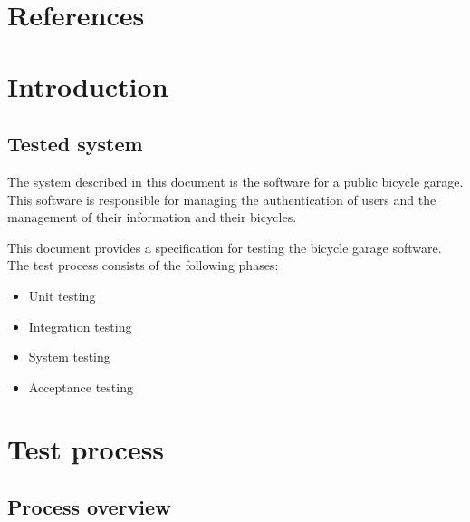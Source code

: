 \documentclass[12pt,titlepage,bibliography=totoc]{article}
\begin{document}


\maketitle
\newpage
\tableofcontents
\thispagestyle{empty}
\setcounter{page}{0}
\newpage


\section{References}
\label{sec:references}


\section{Introduction}
\label{sec:introduction}
\subsection{Tested system}

The system described in this document is the software for a public bicycle
garage. This software is responsible for managing the authentication of users
and the management of their information and their bicycles.

This document provides a specification for testing the bicycle garage software.
The test process consists of the following phases:

\begin{itemize}
	\item Unit testing
	\item Integration testing
	\item System testing
	\item Acceptance testing
\end{itemize}


\section{Test process}
\label{sec:test-process}
\subsection{Process overview}
\end{document}
